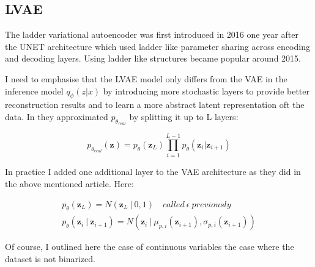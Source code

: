 \documentclass[12pt, english]{article}
\begin{document}
\subsection{LVAE}

\vspace{5mm}

\par The ladder variational autoencoder was first introduced in 2016 \cite{sonderby2016ladder} one year after the UNET \cite{ronneberger2015u} architecture which used ladder like parameter sharing across encoding and decoding layers. Using ladder like structures became popular around 2015.

\vspace{4mm}

\par I need to emphasise that the LVAE model only differs from the VAE in the inference model $q_{\phi} (z | x)$ by introducing more stochastic layers to provide better reconstruction results and to learn a more abstract latent representation oft the data. In \cite{sonderby2016ladder} they approximated $p_{\theta_{real}}$ by splitting it up to L layers:

\vspace{4mm}

\begin{equation}
    p_{\theta_{real}}(\bm{z}) =  p_{\theta}(\bm{z}_{L})\prod_{i = 1}^{L - 1}p_{\theta}(\bm{z}_i | \bm{z}_{i+1})
\end{equation}

\vspace{4mm}

\par In practice I added one additional layer to the VAE architecture as they did in the above mentioned article. Here:

\vspace{4mm}

\begin{gather*}
    p_{\theta}(\bm{z}_L) = N(\bm{z}_L  ~ | ~ 0, 1) \quad called\ \epsilon\ previously\\
    p_{\theta}(\bm{z}_i ~ | ~ \bm{z}_{i+1}) = N(\bm{z}_i ~ |  ~ \mu_{p,i}(\bm{z}_{i+1}), \sigma_{p, i}(\bm{z}_{i+1}))
\end{gather*}

\vspace{4mm}

\par Of course, I outlined here the case of continuous variables the case where the dataset is not binarized. 
\end{document}
